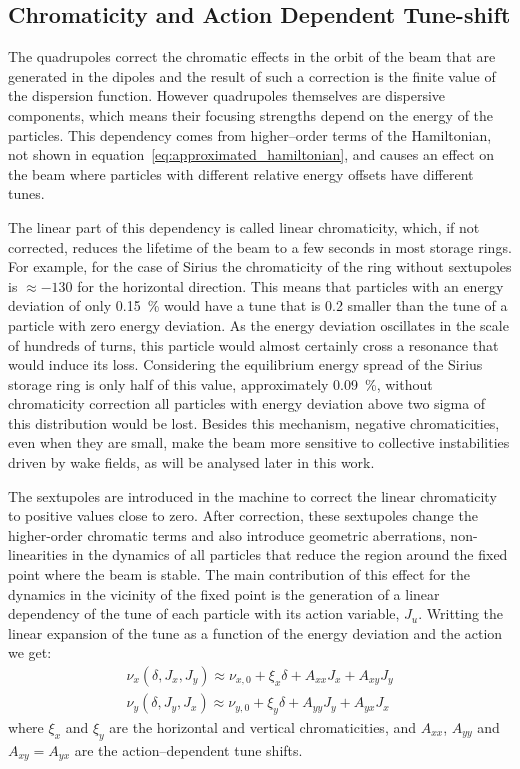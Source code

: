 \subsection{Chromaticity and Action Dependent Tune-shift}\label{sec:chromaticity}

	The quadrupoles correct the chromatic effects in the orbit of the beam that are generated in the dipoles and the result of such a correction is the finite value of the dispersion function. However quadrupoles themselves are dispersive components, which means their focusing strengths depend on the energy of the particles. This dependency comes from higher--order terms of the Hamiltonian, not shown in equation~\eqref{eq:approximated_hamiltonian}, and causes an effect on the beam where particles with different relative energy offsets have different tunes.

    The linear part of this dependency is called linear chromaticity, which, if not corrected, reduces the lifetime of the beam to a few seconds in most storage rings. For example, for the case of Sirius the chromaticity of the ring without sextupoles is $\approx -130$ for the horizontal direction. This means that particles with an energy deviation of only \SI{0.15}{\percent} would have a tune that is \SI{0.2}{} smaller than the tune of a particle with zero energy deviation. As the energy deviation oscillates in the scale of hundreds of turns, this particle would almost certainly cross a resonance that would induce its loss. Considering the equilibrium energy spread of the Sirius storage ring is only half of this value, approximately \SI{0.09}{\percent}, without chromaticity correction all particles with energy deviation above two sigma of this distribution would be lost. Besides this mechanism, negative chromaticities, even when they are small, make the beam more sensitive to collective instabilities driven by wake fields, as will be analysed later in this work.

	The sextupoles are introduced in the machine to correct the linear chromaticity to positive values close to zero. After correction, these sextupoles change the higher-order chromatic terms and also introduce geometric aberrations, non-linearities in the dynamics of all particles that reduce the region around the fixed point where the beam is stable. The main contribution of this effect for the dynamics in the vicinity of the fixed point is the generation of a linear dependency of the tune of each particle with its action variable, $J_u$. Writting the linear expansion of the tune as a function of the energy deviation and the action we get:
	\begin{align}
		\nu_x(\delta, J_x, J_y) \approx \nu_{x,0} + \xi_x \delta + A_{xx} J_x + A_{xy} J_y \\\nonumber
		\nu_y(\delta, J_y, J_x) \approx \nu_{y,0} + \xi_y \delta + A_{yy} J_y + A_{yx} J_x
	\end{align}
	where $\xi_x$ and $\xi_y$ are the horizontal and vertical chromaticities, and $A_{xx}$, $A_{yy}$ and $A_{xy}=A_{yx}$ are the action--dependent tune shifts.

